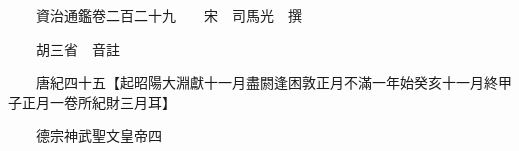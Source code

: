 










 


 
 


 

  
  
  
  
  





  
  
  
  
  
 
  

  

  
  
  



  

 
 

  
   




  

  
  


  　　資治通鑑卷二百二十九　　宋　司馬光　撰

　　胡三省　音註

　　唐紀四十五【起昭陽大淵獻十一月盡閼逢困敦正月不滿一年始癸亥十一月終甲子正月一卷所紀財三月耳】

　　德宗神武聖文皇帝四

